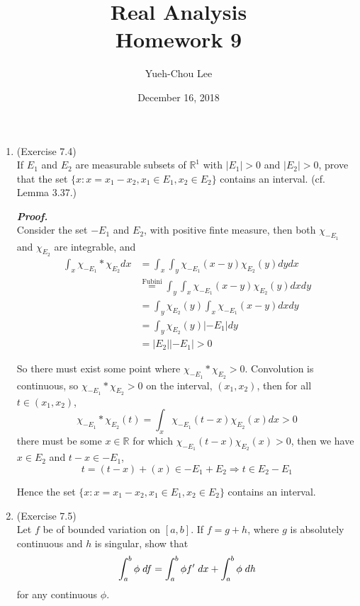 \documentclass[a4paper,11pt]{article}
\title{Real Analysis \\ Homework 9}
\author{Yueh-Chou Lee}
\date{December 16, 2018}
\begin{document}
\maketitle
 \begin{enumerate}

 	\item (Exercise 7.4)\\
 		If $E_1$ and $E_2$ are measurable subsets of $\mathbb{R}^1$ with $|E_1| > 0$ and $|E_2| > 0$, prove that the set $\{ x: x = x_1 - x_2, x_1 \in E_1, x_2 \in E_2 \}$ contains an interval. (cf. Lemma 3.37.)\

 		\textit{\textbf {Proof.}}\\
 		Consider the set $-E_1$ and $E_2$, with positive finte measure, then both $\chi_{-E_1}$ and $\chi_{E_2}$ are integrable, and
 		$$\begin{aligned}
 		\int_x \chi_{-E_1} * \chi_{E_2} dx
 		&= \int_x \int_y \chi_{-E_1} (x-y) \chi_{E_2}(y) dy dx\\
 		&\overset{\mbox{Fubini}}{=} \int_y \int_x \chi_{-E_1} (x-y) \chi_{E_2}(y) dx dy\\
 		&= \int_y \chi_{E_2}(y) \int_x \chi_{-E_1} (x-y) dx dy\\
 		&= \int_y \chi_{E_2}(y) |-E_1| dy\\
 		&= |E_2||-E_1| > 0
 		\end{aligned}$$

 		So there must exist some point where $\chi_{-E_1} * \chi_{E_2} > 0$. Convolution is continuous, so $\chi_{-E_1} * \chi_{E_2} > 0$ on the interval, $(x_1, x_2)$, then for all $t \in (x_1, x_2)$,
 		$$\chi_{-E_1} * \chi_{E_2} (t) = \int_x \chi_{-E_1}(t-x) \chi_{E_2}(x) dx > 0$$
 		there must be some $x \in \mathbb{R}$ for which $\chi_{-E_1}(t-x) \chi_{E_2}(x) > 0$, then we have $x \in E_2$ and $t-x \in -E_1$,
 		$$t = (t - x) + (x) \in -E_1 + E_2 \Rightarrow t \in E_2 - E_1$$

 		Hence the set $\{ x: x = x_1 - x_2, x_1 \in E_1, x_2 \in E_2 \}$ contains an interval.\\







 	\item (Exercise 7.5)\\
 		Let $f$ be of bounded variation on $[a,b]$. If $f = g + h$, where $g$ is absolutely continuous and $h$ is singular, show that
 		$$\int_a^b \phi \hspace{0.1cm} df
 		= \int_a^b \phi f' \hspace{0.1cm} dx + \int_a^b \phi \hspace{0.1cm} dh$$
 		for any continuous $\phi$.\


\end{enumerate}
\end{document}
